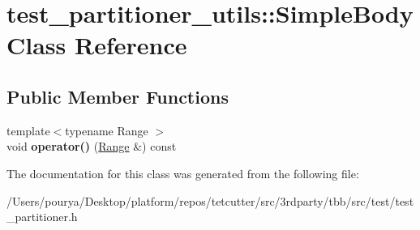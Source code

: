 \hypertarget{classtest__partitioner__utils_1_1SimpleBody}{}\section{test\+\_\+partitioner\+\_\+utils\+:\+:Simple\+Body Class Reference}
\label{classtest__partitioner__utils_1_1SimpleBody}
\subsection*{Public Member Functions}
\begin{DoxyCompactItemize}
\item 
\hypertarget{classtest__partitioner__utils_1_1SimpleBody_a534f64d94c494ed7f2f89308f031be67}{}{\footnotesize template$<$typename Range $>$ }\\void {\bfseries operator()} (\hyperlink{classtbb_1_1blocked__range}{Range} \&) const \label{classtest__partitioner__utils_1_1SimpleBody_a534f64d94c494ed7f2f89308f031be67}

\end{DoxyCompactItemize}


The documentation for this class was generated from the following file\+:\begin{DoxyCompactItemize}
\item 
/\+Users/pourya/\+Desktop/platform/repos/tetcutter/src/3rdparty/tbb/src/test/test\+\_\+partitioner.\+h\end{DoxyCompactItemize}
